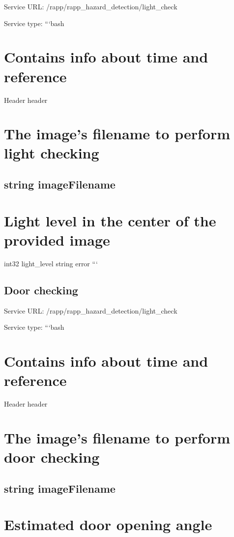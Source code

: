 Service U\-R\-L\-: {\ttfamily /rapp/rapp\-\_\-hazard\-\_\-detection/light\-\_\-check}

Service type\-: ```bash \section*{Contains info about time and reference}

Header header \section*{The image's filename to perform light checking}

\subsection*{string image\-Filename }

\section*{Light level in the center of the provided image}

int32 light\-\_\-level string error ```

\subsection*{Door checking}

Service U\-R\-L\-: {\ttfamily /rapp/rapp\-\_\-hazard\-\_\-detection/light\-\_\-check}

Service type\-: ```bash \section*{Contains info about time and reference}

Header header \section*{The image's filename to perform door checking}

\subsection*{string image\-Filename }

\section*{Estimated door opening angle}


